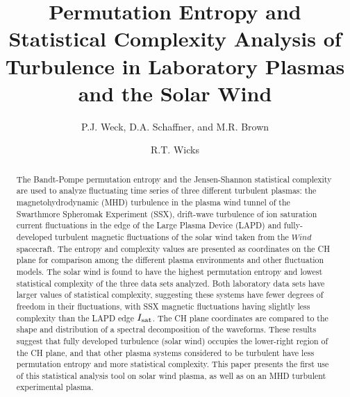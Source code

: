 \documentclass[aps,prx,twocolumn,secnumarabic,nobalancelastpage,amsmath,amssymb,
nofootinbib]{revtex4-1}
\begin{document}
\title{Permutation Entropy and Statistical Complexity Analysis of Turbulence in Laboratory Plasmas and the Solar Wind}
\author{P.J. Weck, D.A. Schaffner, and M.R. Brown}
\author{R.T. Wicks}
\begin{abstract}
The Bandt-Pompe permutation entropy and the Jensen-Shannon statistical complexity are used to analyze fluctuating time series of three different turbulent plasmas: the magnetohydrodynamic (MHD) turbulence in the plasma wind tunnel of the Swarthmore Spheromak Experiment (SSX), drift-wave turbulence of ion saturation current fluctuations in the edge of the Large Plasma Device (LAPD) and fully-developed turbulent magnetic fluctuations of the solar wind taken from the $\textit{Wind} $ spacecraft. The entropy and complexity values are presented as coordinates on the CH plane for comparison among the different plasma environments and other fluctuation models. The solar wind is found to have the highest permutation entropy and lowest statistical complexity of the three data sets analyzed. Both laboratory data sets have larger values of statistical complexity, suggesting these systems have fewer degrees of freedom in their fluctuations, with SSX magnetic fluctuations having slightly less complexity than the LAPD edge $I_{\rm sat}$. The CH plane coordinates are compared to the shape and distribution of a spectral decomposition of the waveforms. These results suggest that fully developed turbulence (solar wind) occupies the lower-right region of the CH plane, and that other plasma systems considered to be turbulent have less permutation entropy and more statistical complexity. This paper presents the first use of this statistical analysis tool on solar wind plasma, as well as on an MHD turbulent experimental plasma.
\end{abstract}
\maketitle
\end{document}
